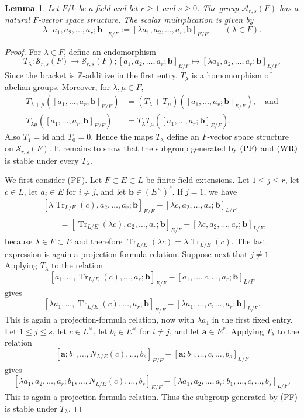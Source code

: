 \documentclass[a4paper,12pt,reqno]{amsart}
\numberwithin{equation}{section}
\newtheorem{lem}[lem]{Lemma}
\theoremstyle{definition}
\newcommand{\Z}{\mathbb{Z}}
\DeclareMathOperator{\Tr}{Tr}
\newcommand{\Id}{\mathrm{id}}
\newcommand{\Acal}{\mathcal{A}}
\newcommand{\va}{\mathbf{a}}
\newcommand{\vb}{\mathbf{b}}
\begin{document}
\begin{lem}\label{lem:Fvec}
Let $F/k$ be a field and let $r\geq1$ and $s\ge 0$.  The group $\Acal_{r,s}(F)$ has a natural $F$-vector space structure.  
The scalar multiplication is given by
\begin{equation}\label{eq:Fact}
 \lambda [a_1,a_2,\ldots,a_r;\vb]_{E/F}
 :=[\lambda a_1,a_2,\ldots,a_r;\vb]_{E/F}
 \qquad(\lambda\in F).
\end{equation}
\end{lem}
\begin{proof}
For $\lambda\in F$, define an endomorphism
\[
 T_\lambda:\mathcal S_{r,s}(F)\to\mathcal S_{r,s}(F); [a_1,a_2,\ldots,a_r;\vb]_{E/F}\mapsto  [\lambda a_1,a_2,\ldots,a_r;\vb]_{E/F}.
\]
Since the bracket is $\Z$-additive in the first entry, $T_\lambda$ is a
homomorphism of abelian groups. 
Moreover, for $\lambda,\mu\in F$,
\begin{align*}
 T_{\lambda+\mu}
 ([a_1,\ldots,a_r;\vb]_{E/F})
&=(T_\lambda+T_\mu)
 ([a_1,\ldots,a_r;\vb]_{E/F}),\quad   \mbox{and}\\
  T_{\lambda\mu}
 ([a_1,\ldots,a_r;\vb]_{E/F})
 &= T_\lambda T_\mu
 ([a_1,\ldots,a_r;\vb]_{E/F}).
\end{align*} 
Also $T_1=\Id$ and $T_0=0$.  Hence the maps $T_\lambda$ define an
$F$-vector space structure on $\mathcal S_{r,s}(F)$. 
It remains to show that the subgroup generated by $\textnormal{(PF)}$ and $\textnormal{(WR)}$ 
is stable under every $T_\lambda$. 

We first consider \textnormal{(PF)}.  
Let $F\subset E\subset L$ be finite field extensions.
Let $1\leq j\leq r$,
    let $c\in L$, let $a_i\in E$ for $i\neq j$, and let $\vb\in (E^\times)^s$.
If $j=1$, we have 
\begin{align*}
 &[\lambda\Tr_{L/E}(c),a_2,\ldots,a_r;\vb]_{E/F}
 -
 [\lambda c,a_2,\ldots,a_r;\vb]_{L/F}\\
 &\qquad=
 [\Tr_{L/E}(\lambda c),a_2,\ldots,a_r;\vb]_{E/F}
 -
 [\lambda c,a_2,\ldots,a_r;\vb]_{L/F},
\end{align*}
because $\lambda\in F\subset E$ and therefore $\Tr_{L/E}(\lambda c)=\lambda\Tr_{L/E}(c)$.
The last expression is again a projection-formula relation.
Suppose next that $j\neq1$.  Applying $T_\lambda$ to the relation
\[
 [a_1,\ldots,\Tr_{L/E}(c),\ldots,a_r;\vb]_{E/F}
 -
 [a_1,\ldots,c,\ldots,a_r;\vb]_{L/F}
\]
gives
\[
 [\lambda a_1,\ldots,\Tr_{L/E}(c),\ldots,a_r;\vb]_{E/F}
 -
 [\lambda a_1,\ldots,c,\ldots,a_r;\vb]_{L/F}.
\]
This is again a projection-formula relation, now with $\lambda a_1$ in
the first fixed entry.  
Let $1\leq j\leq s$,
    let $c\in L^\times$, let $b_i\in E^\times$ for $i\neq j$, and let $\va\in E^r$.  
    Applying $T_\lambda$ to the relation
\[
 [\va;b_1,\ldots,N_{L/E}(c),\ldots,b_s]_{E/F}
 -
 [\va;b_1,\ldots,c,\ldots,b_s]_{L/F}
\]
gives
\[
 [\lambda a_1,a_2,\ldots,a_r;b_1,\ldots,N_{L/E}(c),\ldots,b_s]_{E/F}
 -
 [\lambda a_1,a_2,\ldots,a_r;b_1,\ldots,c,\ldots,b_s]_{L/F}.
\]
This is again a projection-formula relation.
Thus the subgroup generated by
\textnormal{(PF)} is stable under $T_\lambda$.


\end{proof}
\end{document}
